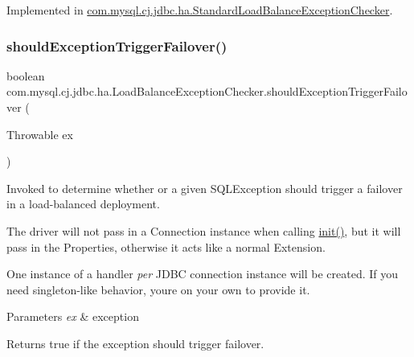 Implemented in \mbox{\hyperlink{classcom_1_1mysql_1_1cj_1_1jdbc_1_1ha_1_1_standard_load_balance_exception_checker_af2f4516746c3615d1a4f3a191805b374}{com.\+mysql.\+cj.\+jdbc.\+ha.\+Standard\+Load\+Balance\+Exception\+Checker}}.

\mbox{\label{interfacecom_1_1mysql_1_1cj_1_1jdbc_1_1ha_1_1_load_balance_exception_checker_a5d8bf713d492a85c62b52278437c4e60}} 
\subsubsection{\texorpdfstring{should\+Exception\+Trigger\+Failover()}{shouldExceptionTriggerFailover()}}
{\footnotesize\ttfamily boolean com.\+mysql.\+cj.\+jdbc.\+ha.\+Load\+Balance\+Exception\+Checker.\+should\+Exception\+Trigger\+Failover (\begin{DoxyParamCaption}\item[{Throwable}]{ex }\end{DoxyParamCaption})}

Invoked to determine whether or a given S\+Q\+L\+Exception should trigger a failover in a load-\/balanced deployment.

The driver will not pass in a Connection instance when calling \mbox{\hyperlink{interfacecom_1_1mysql_1_1cj_1_1jdbc_1_1ha_1_1_load_balance_exception_checker_a41c1fd3f7eb7f6cd92cc174465b6574e}{init()}}, but it will pass in the Properties, otherwise it acts like a normal Extension.

One instance of a handler {\itshape per} J\+D\+BC connection instance will be created. If you need singleton-\/like behavior, you\textquotesingle{}re on your own to provide it.


\begin{DoxyParams}{Parameters}
{\em ex} & exception \\
\hline
\end{DoxyParams}
\begin{DoxyReturn}{Returns}
true if the exception should trigger failover. 
\end{DoxyReturn}


